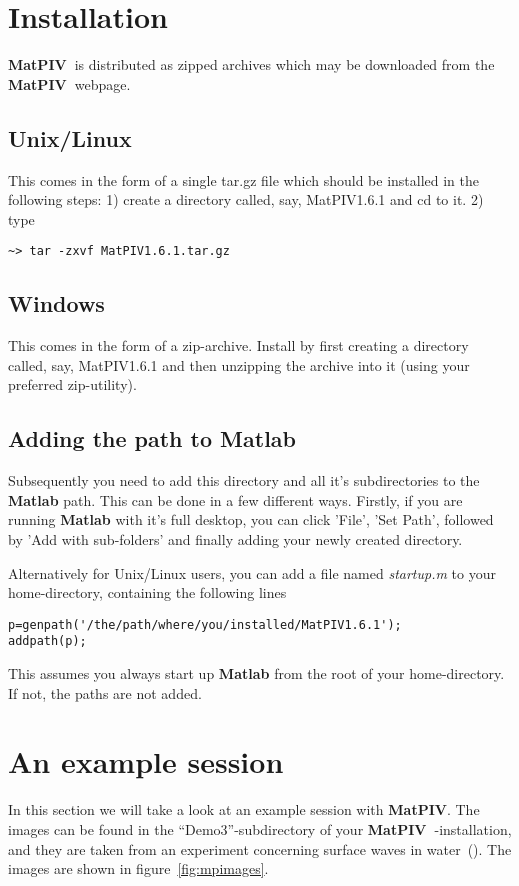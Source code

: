 \documentclass{book}
\newcommand{\matpiv}{{\bf MatPIV~}}
\begin{document}
\chapter{Installation}

\matpiv is distributed as zipped archives which may be downloaded from
the \matpiv webpage. 

\section{Unix/Linux}
This comes in the form of a single tar.gz file which should be installed
in the following steps: 1) create a directory called, say, MatPIV1.6.1
and cd to it. 2) type
\begin{verbatim}
~> tar -zxvf MatPIV1.6.1.tar.gz 
\end{verbatim}

\section{Windows}
This comes in the form of a zip-archive. Install by first creating a
directory called, say, MatPIV1.6.1 and then unzipping the archive into
it (using your preferred zip-utility).

\section{Adding the path to Matlab}
Subsequently you need to add this directory and all it's subdirectories
to the {\bf Matlab} path. This can be done in a few different ways.
Firstly, if you are running {\bf Matlab} with it's full desktop, you can
click 'File', 'Set Path', followed by 'Add with sub-folders' and finally
adding your newly created directory.

Alternatively for Unix/Linux users, you can add a file named {\em
startup.m} to your home-directory, containing the following lines
\begin{verbatim}
p=genpath('/the/path/where/you/installed/MatPIV1.6.1');
addpath(p);
\end{verbatim}
This assumes you always start up {\bf Matlab} from the root of your
home-directory. If not, the paths are not added.


\chapter{An example session}
In this section we will take a look at an example session with {\bf
MatPIV}. The images can be found in the ``Demo3''-subdirectory of your
\matpiv{}-installation, and they are taken from an experiment concerning
surface waves in water~(\cite{Jensen:1999}). The images are shown in
figure~\ref{fig:mpimages}.
\end{document}
